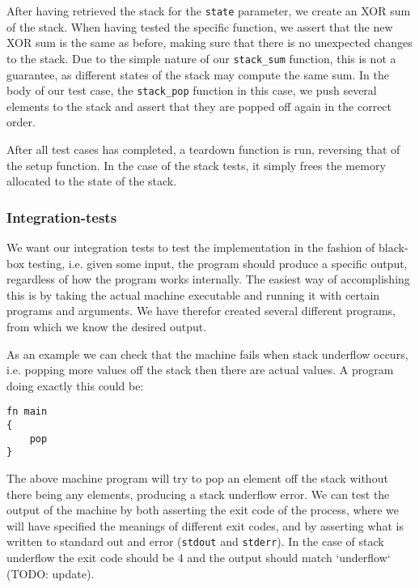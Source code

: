 After having retrieved the stack for the {\tt state} parameter, we create an XOR
sum of the stack. When having tested the specific function, we assert that the
new XOR sum is the same as before, making sure that there is no unexpected
changes to the stack. Due to the simple nature of our {\tt stack\_sum} function,
this is not a guarantee, as different states of the stack may compute the same
sum. %
In the body of our test case, the {\tt stack\_pop} function in this case, we
push several elements to the stack and assert that they are popped off again in
the correct order.

After all test cases has completed, a teardown function is run, reversing that
of the setup function. In the case of the stack tests, it simply frees the
memory allocated to the state of the stack.
%


\subsubsection{Integration-tests}
We want our integration tests to test the implementation in the fashion of
black-box testing, i.e. given some input, the program should produce a specific
output, regardless of how the program works internally. The easiest way of
accomplishing this is by taking the actual machine executable and running it
with certain programs and arguments. We have therefor created several different
programs, from which we know the desired output.

As an example we can check that the machine fails when stack underflow occurs,
i.e. popping more values off the stack then there are actual values. A program
doing exactly this could be:
\begin{lstlisting}[language={bytecode},caption={Machine program producing
stack underflow}]
fn main
{
	pop
}
\end{lstlisting}

The above machine program will try to pop an element off the stack without there
being any elements, producing a stack underflow error. We can test the output of
the machine by both asserting the exit code of the process, where we will have
specified the meanings of different exit codes, and by asserting what is written
to standard out and error ({\tt stdout} and {\tt stderr}). In the case of stack
underflow the exit code should be 4 and the output should match `underflow`
(TODO: update).

